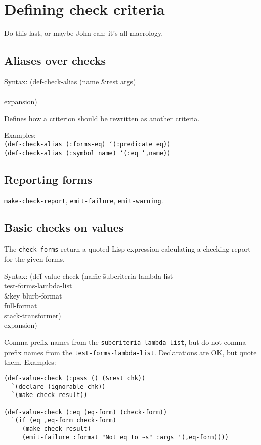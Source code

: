 \section{Defining check criteria}
 Do this last, or maybe John
can; it's all macrology.
\subsection{Aliases over checks}
{\ttfamily\begin{tabbing}
\textrm{Syntax: 
}(de\=f-check-alias (name \&rest args)
\\ \> [ documentation ]
\\ \> expansion)
\end{tabbing}}
Defines how a criterion should be rewritten as another criteria.

Examples:
\\ \texttt{(def-check-alias (:forms-eq) `(:predicate eq))}
\\ \texttt{(def-check-alias (:symbol name) `(:eq ',name))}
\par{}

\subsection{Reporting forms}
\texttt{make-check-report}, \texttt{emit-failure}, \texttt{emit-warning}.
\par{}

\subsection{Basic checks on values}
The \texttt{check-forms} return a quoted Lisp expression calculating a
checking report for the given forms.  
{\ttfamily\begin{tabbing}
\textrm{Syntax: 
}(de\=f-value-check (na\=me \=subcriteria-lambda-list
\\ \> \> \> test-forms-lambda-list
\\ \> \> \&key \= blurb-format
\\ \> \>        \> full-format
\\ \> \>        \> stack-transformer)
\\ \> expansion)
\end{tabbing}}
Comma-prefix names from the \texttt{subcriteria-lambda-list}, but do not
comma-prefix names from the \texttt{test-forms-lambda-list}.
Declarations are OK, but quote them.  Examples:
\begin{verbatim}
(def-value-check (:pass () (&rest chk))
  `(declare (ignorable chk))
  `(make-check-result))

(def-value-check (:eq (eq-form) (check-form))
  `(if (eq ,eq-form check-form)
     (make-check-result)
     (emit-failure :format "Not eq to ~s" :args '(,eq-form))))
\end{verbatim}
\par{}

